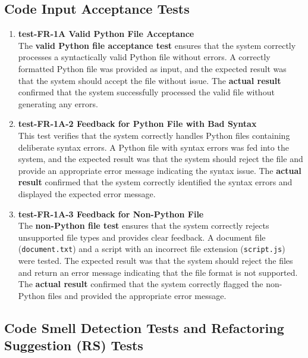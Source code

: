 \documentclass[12pt, titlepage]{article}
\begin{document}
\subsection{Code Input Acceptance Tests}
\begin{enumerate}

  \item \textbf{test-FR-1A Valid Python File Acceptance} \\[2mm]
    The \textbf{valid Python file acceptance test} ensures that the
    system correctly processes a syntactically valid Python file
    without errors. A correctly formatted Python file was provided as
    input, and the expected result was that the system should accept
    the file without issue. The \textbf{actual result} confirmed that
    the system successfully processed the valid file without
    generating any errors.

  \item \textbf{test-FR-1A-2 Feedback for Python File with Bad Syntax} \\[2mm]
    This test verifies that the system correctly handles Python files
    containing deliberate syntax errors. A Python file with syntax
    errors was fed into the system, and the expected result was that
    the system should reject the file and provide an appropriate
    error message indicating the syntax issue. The \textbf{actual
    result} confirmed that the system correctly identified the syntax
    errors and displayed the expected error message.

  \item \textbf{test-FR-1A-3 Feedback for Non-Python File} \\[2mm]
    The \textbf{non-Python file test} ensures that the system
    correctly rejects unsupported file types and provides clear
    feedback. A document file (\texttt{document.txt}) and a script
    with an incorrect file extension (\texttt{script.js}) were
    tested. The expected result was that the system should reject the
    files and return an error message indicating that the file format
    is not supported. The \textbf{actual result} confirmed that the
    system correctly flagged the non-Python files and provided the
    appropriate error message.

\end{enumerate}

\subsection{Code Smell Detection Tests and Refactoring Suggestion (RS) Tests}
\label{subsec:code-smells-detection}
\end{document}

